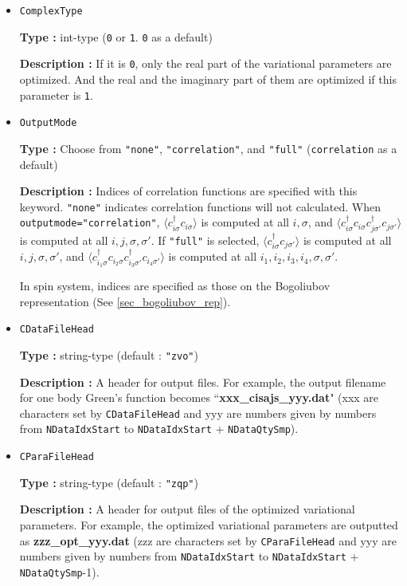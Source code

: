 \begin{itemize}
\item  \verb|ComplexType|
  
  {\bf Type :} int-type (\verb|0| or \verb|1|. \verb|0| as a default)

  {\bf Description :}
  If it is \verb|0|, only the real part of the variational parameters are optimized.
  And the real and the imaginary part of them are optimized if this parameter is \verb|1|.

\item \verb|OutputMode|

  {\bf Type :} Choose from \verb|"none"|, \verb|"correlation"|, and \verb|"full"|
  (\verb|correlation| as a default)

  {\bf Description :} Indices of correlation functions
  are specified with this keyword.
  \verb|"none"| indicates correlation functions will not calculated.
  When \verb|outputmode="correlation"|,
  $\langle c_{i \sigma}^{\dagger}c_{i \sigma} \rangle$ is computed at all $i, \sigma$,
  and
  $\langle c_{i \sigma}^{\dagger}c_{i \sigma} c_{j \sigma'}^{\dagger}c_{j \sigma'} \rangle$
  is computed at all $i, j, \sigma, \sigma'$.
  If \verb|"full"| is selected,
  $\langle c_{i \sigma}^{\dagger}c_{j \sigma'} \rangle$ is computed at all $i, j, \sigma, \sigma'$,
  and
  $\langle c_{i_1 \sigma}^{\dagger}c_{i_2 \sigma} c_{i_3 \sigma'}^{\dagger}c_{i_4 \sigma'} \rangle$
  is computed at all $i_1, i_2, i_3, i_4, \sigma, \sigma'$.
  
  In spin system, 
  indices are specified as those on the Bogoliubov representation
  (See \ref{sec_bogoliubov_rep}).

  \item  \verb|CDataFileHead|

 {\bf Type :} string-type (default : \verb|"zvo"|)

{\bf Description :} A header for output files. For example, the output filename for one body Green's function becomes ``{\bf xxx\_cisajs\_yyy.dat}" (xxx are characters set by \verb|CDataFileHead| and yyy are numbers given by numbers from \verb|NDataIdxStart| to \verb|NDataIdxStart| +  \verb|NDataQtySmp|). 

 \item  \verb|CParaFileHead|

 {\bf Type :} string-type (default : \verb|"zqp"|)

{\bf Description :}  A header for output files of the optimized variational parameters. For example, the optimized variational parameters are outputted as  {\bf zzz\_opt\_yyy.dat} (zzz are characters set by \verb|CParaFileHead| and yyy are numbers given by numbers from \verb|NDataIdxStart| to \verb|NDataIdxStart| +  \verb|NDataQtySmp|-1).

\end{itemize}


